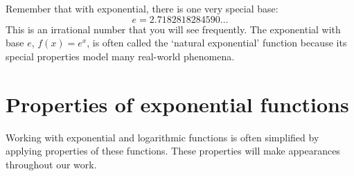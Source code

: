 \documentclass{ximera}
\begin{document}
%
%   

Remember that with exponential, there is one very special
base:
\[ e = 2.7182818284590\ldots \]
This is an irrational number that you will see frequently. The exponential with base $e$,
$f(x) = e^x$, is often called the `natural exponential' function because its special properties model many real-world phenomena. %


%
%
%  


\section{Properties of exponential functions}

Working with exponential and logarithmic functions is often simplified by  
applying properties of these functions.  These properties will make appearances 
throughout our work.
\end{document}
